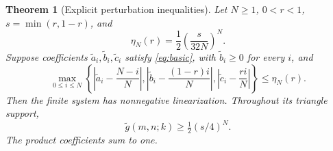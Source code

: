 \documentclass[11pt]{article}
\newtheorem{theorem}{Theorem}
\begin{document}
\begin{theorem}[Explicit perturbation inequalities]\label{thm:perturbation}
Let $N\geq1$, $0<r<1$, $s=\min(r,1-r)$, and
\begin{equation}\label{eq:radius}
\eta_N(r)=\frac12\left(\frac{s}{32N}\right)^N.
\end{equation}
Suppose coefficients $\widetilde a_i,\widetilde b_i,\widetilde c_i$ satisfy \eqref{eq:basic}, with $\widetilde b_i\geq0$ for every $i$, and
\begin{equation}\label{eq:closeness}
\max_{0\leq i\leq N}\left\{
\left|\widetilde a_i-\frac{N-i}{N}\right|,
\left|\widetilde b_i-\frac{(1-r)i}{N}\right|,
\left|\widetilde c_i-\frac{ri}{N}\right|\right\}\leq\eta_N(r).
\end{equation}
Then the finite system has nonnegative linearization. Throughout its triangle support,
\[
\widetilde g(m,n;k)\geq\tfrac12(s/4)^N.
\]
The product coefficients sum to one.
\end{theorem}
\end{document}
